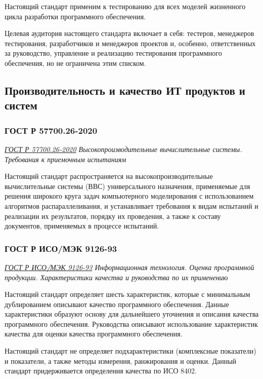 Настоящий стандарт применим к тестированию
для всех моделей жизненного цикла разработки программного обеспечения.

Целевая аудитория настоящего стандарта включает в себя:
тестеров, менеджеров тестирования, разработчиков и менеджеров проектов и,
особенно, ответственных за руководство, управление
и реализацию тестирования программного обеспечения,
но не ограничена этим списком.

\subsection{Производительность и качество ИТ продуктов и систем}

\subsubsection{ГОСТ Р 57700.26-2020}

\emph{\href{https://docs.cntd.ru/document/573114591}{ГОСТ Р 57700.26-2020}
Высокопроизводительные вычислительные системы.
Требования к приемочным испытаниям
}

Настоящий стандарт распространяется
на высокопроизводительные вычислительные системы (ВВС)
универсального назначения,
применяемые для решения широкого круга задач компьютерного моделирования
с использованием алгоритмов распараллеливания,
и устанавливает требования к видам испытаний и реализации их результатов,
порядку их проведения, а также к составу документов,
применяемых в процессе испытаний.

\subsubsection{ГОСТ Р ИСО/МЭК 9126-93}

\emph{\href{https://docs.cntd.ru/document/1200009076}{ГОСТ Р ИСО/МЭК 9126-93}
Информационная технология.
Оценка программной продукции.
Характеристики качества и руководства по их применению
}

Настоящий стандарт определяет шесть характеристик,
которые с минимальным дублированием описывают качество программного обеспечения.
Данные характеристики образуют основу для дальнейшего уточнения
и описания качества программного обеспечения.
Руководства описывают использование характеристик качества
для оценки качества программного обеспечения.

Настоящий стандарт не определяет подхарактеристики (комплексные показатели)
и показатели, а также методы измерения, ранжирования и оценки.
Данный стандарт придерживается определения качества по ИСО 8402.

